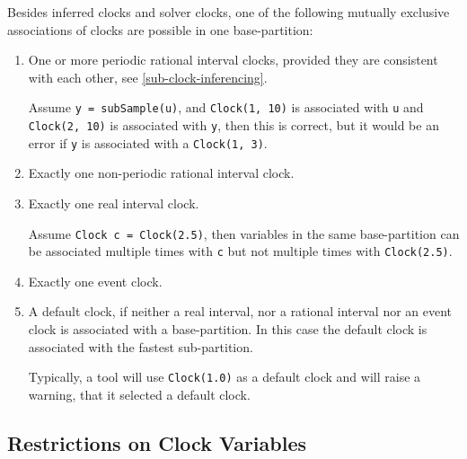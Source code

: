 Besides inferred clocks and solver clocks, one of the following mutually exclusive associations of clocks are possible in one base-partition:
\begin{enumerate}
\item
  One or more periodic rational interval clocks, provided they are consistent with each other, see \cref{sub-clock-inferencing}.
  \begin{example}
  Assume \lstinline!y = subSample(u)!, and \lstinline!Clock(1, 10)! is associated with \lstinline!u! and \lstinline!Clock(2, 10)! is associated with \lstinline!y!, then this is correct, but it would be an error if \lstinline!y! is associated with a \lstinline!Clock(1, 3)!.
  \end{example}
\item
  Exactly one non-periodic rational interval clock.
\item
  Exactly one real interval clock.
  \begin{example}
  Assume \lstinline!Clock c = Clock(2.5)!, then variables in the same base-partition can be associated multiple times with \lstinline!c! but not multiple times with \lstinline!Clock(2.5)!.
  \end{example}
\item
  Exactly one event clock.
\item
  A default clock, if neither a real interval, nor a rational interval nor an event clock is associated with a base-partition.
  In this case the default clock is associated with the fastest sub-partition.
  \begin{nonnormative}
  Typically, a tool will use \lstinline!Clock(1.0)! as a default clock and will raise a warning, that it selected a default clock.
  \end{nonnormative}
\end{enumerate}

\subsection{Restrictions on Clock Variables}\label{restrictions-on-clock-variables}

